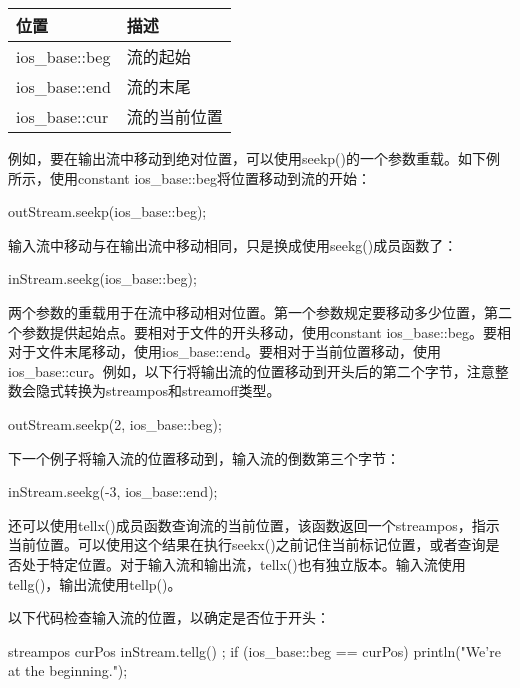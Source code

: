 \begin{longtable}{|l|l|}
\hline
\textbf{位置} & \textbf{描述}               \\ \hline
\endfirsthead
%
\endhead
%
ios\_base::beg    & 流的起始       \\ \hline
ios\_base::end    & 流的末尾              \\ \hline
ios\_base::cur    & 流的当前位置 \\ \hline
\end{longtable}

例如，要在输出流中移动到绝对位置，可以使用seekp()的一个参数重载。如下例所示，使用constant ios\_base::beg将位置移动到流的开始：

\begin{cpp}
outStream.seekp(ios_base::beg);
\end{cpp}

输入流中移动与在输出流中移动相同，只是换成使用seekg()成员函数了：

\begin{cpp}
inStream.seekg(ios_base::beg);
\end{cpp}

两个参数的重载用于在流中移动相对位置。第一个参数规定要移动多少位置，第二个参数提供起始点。要相对于文件的开头移动，使用constant ios\_base::beg。要相对于文件末尾移动，使用ios\_base::end。要相对于当前位置移动，使用ios\_base::cur。例如，以下行将输出流的位置移动到开头后的第二个字节，注意整数会隐式转换为streampos和streamoff类型。

\begin{cpp}
outStream.seekp(2, ios_base::beg);
\end{cpp}

下一个例子将输入流的位置移动到，输入流的倒数第三个字节：

\begin{cpp}
inStream.seekg(-3, ios_base::end);
\end{cpp}

还可以使用tellx()成员函数查询流的当前位置，该函数返回一个streampos，指示当前位置。可以使用这个结果在执行seekx()之前记住当前标记位置，或者查询是否处于特定位置。对于输入流和输出流，tellx()也有独立版本。输入流使用tellg()，输出流使用tellp()。

以下代码检查输入流的位置，以确定是否位于开头：

\begin{cpp}
streampos curPos { inStream.tellg() };
if (ios_base::beg == curPos) {
    println("We're at the beginning.");
}
\end{cpp}

